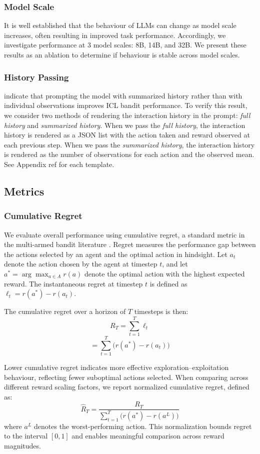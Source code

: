 \documentclass{article} %
\begin{document}
\subsubsection*{Model Scale}
It is well established that the behaviour of LLMs can change as model scale increases, often resulting in improved task performance. Accordingly, we investigate performance at 3 model scales: 8B, 14B, and 32B. We present these results as an ablation to determine if behaviour is stable across model scales.

\subsubsection*{History Passing}
\citet{krishna_icl} indicate that prompting the model with summarized history rather than with individual observations improves ICL bandit performance. To verify this result,  we consider two methods of rendering the interaction history in the prompt: \textit{full history} and \textit{summarized history}. When we pass the \textit{full history}, the interaction history is rendered as a JSON list with the action taken and reward observed at each previous step. When we pass the \textit{summarized history}, the interaction history is rendered as the number of observations for each action and the observed mean. See Appendix ref for each template. 

\subsection*{Metrics}
\subsubsection*{Cumulative Regret}
We evaluate overall performance using cumulative regret, a standard metric in the multi-armed bandit literature \citep{bubeck2012regret}. Regret measures the performance gap between the actions selected by an agent and the optimal action in hindsight. Let $a_t$ denote the action chosen by the agent at timestep $t$, and let $a^* = \arg\max_{a \in A} r(a)$ denote the optimal action with the highest expected reward. The instantaneous regret at timestep $t$ is defined as $\ell_t = r(a^*) - r(a_t)$.

The cumulative regret over a horizon of $T$ timesteps is then:
\[R_T = \sum_{t=1}^{T} \ell_t\]
    \[= \sum_{t=1}^{T} \bigl(r(a^*) - r(a_t)\bigr)\]

Lower cumulative regret indicates more effective exploration–exploitation behaviour, reflecting fewer suboptimal actions selected. When comparing across different reward scaling factors, we report normalized cumulative regret, defined as:
%
\[\hat{R}_T = \frac{R_T}{\sum_{t=1}^{T} \bigl(r(a^*) - r(a^L)\bigr)}\]
where $a^L$ denotes the worst-performing action. This normalization bounds regret to the interval $[0,1]$ and enables meaningful comparison across reward magnitudes.
\end{document}
